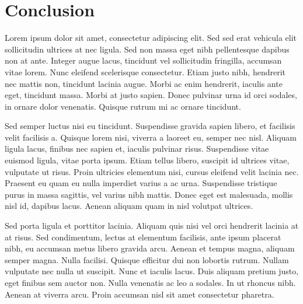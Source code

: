 \chapter{Conclusion}
\label{ch:conclusion}

Lorem ipsum dolor sit amet, consectetur adipiscing elit. Sed sed erat vehicula elit sollicitudin ultrices at nec ligula. Sed non massa eget nibh pellentesque dapibus non at ante. Integer augue lacus, tincidunt vel sollicitudin fringilla, accumsan vitae lorem. Nunc eleifend scelerisque consectetur. Etiam justo nibh, hendrerit nec mattis non, tincidunt lacinia augue. Morbi ac enim hendrerit, iaculis ante eget, tincidunt massa. Morbi at justo sapien. Donec pulvinar urna id orci sodales, in ornare dolor venenatis. Quisque rutrum mi ac ornare tincidunt.

Sed semper luctus nisi eu tincidunt. Suspendisse gravida sapien libero, et facilisis velit facilisis a. Quisque lorem nisi, viverra a laoreet eu, semper nec nisl. Aliquam ligula lacus, finibus nec sapien et, iaculis pulvinar risus. Suspendisse vitae euismod ligula, vitae porta ipsum. Etiam tellus libero, suscipit id ultrices vitae, vulputate ut risus. Proin ultricies elementum nisi, cursus eleifend velit lacinia nec. Praesent eu quam eu nulla imperdiet varius a ac urna. Suspendisse tristique purus in massa sagittis, vel varius nibh mattis. Donec eget est malesuada, mollis nisl id, dapibus lacus. Aenean aliquam quam in nisl volutpat ultrices.

Sed porta ligula et porttitor lacinia. Aliquam quis nisi vel orci hendrerit lacinia at at risus. Sed condimentum, lectus at elementum facilisis, ante ipsum placerat nibh, eu accumsan metus libero gravida arcu. Aenean et tempus magna, aliquam semper magna. Nulla facilisi. Quisque efficitur dui non lobortis rutrum. Nullam vulputate nec nulla ut suscipit. Nunc et iaculis lacus. Duis aliquam pretium justo, eget finibus sem auctor non. Nulla venenatis ac leo a sodales. In ut rhoncus nibh. Aenean at viverra arcu. Proin accumsan nisl sit amet consectetur pharetra.
